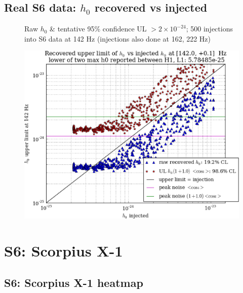 \subsection{Real S6 data: $h_0$ recovered vs injected}

\begin{figure}
\caption{\protect\includegraphics[width=0.4\paperwidth,height=0.2\paperheight]{plots/h0UL-vs-h0injected-142-0Hz.eps}}
Raw $h_0$ \& tentative 95\% confidence UL $>2\times10^{-24}$; 500 injections\\
into S6 data at 142 Hz (injections also done at 162, 222 Hz)
\end{figure}

\section{S6: Scorpius X-1}

\subsection{S6: Scorpius X-1 heatmap}

